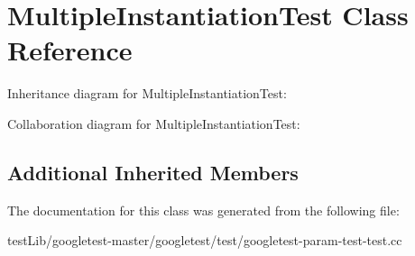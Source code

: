 \hypertarget{classMultipleInstantiationTest}{}\section{Multiple\+Instantiation\+Test Class Reference}
\label{classMultipleInstantiationTest}


Inheritance diagram for Multiple\+Instantiation\+Test\+:


Collaboration diagram for Multiple\+Instantiation\+Test\+:
\subsection*{Additional Inherited Members}


The documentation for this class was generated from the following file\+:\begin{DoxyCompactItemize}
\item 
test\+Lib/googletest-\/master/googletest/test/googletest-\/param-\/test-\/test.\+cc\end{DoxyCompactItemize}
